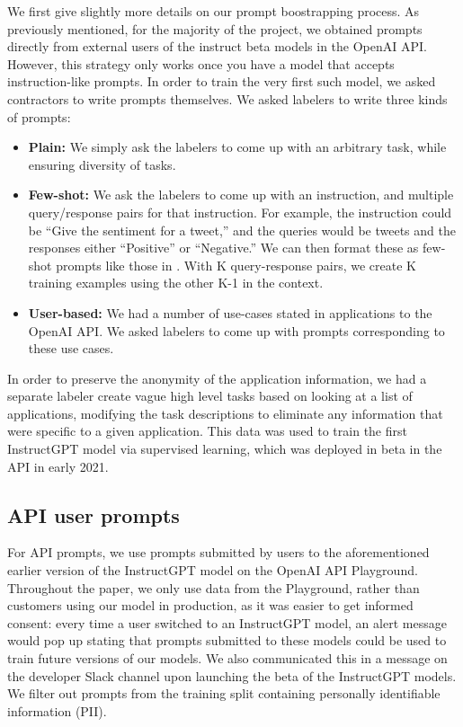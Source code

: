 We first give slightly more details on our prompt boostrapping process. 
As previously mentioned, for the majority of the project, we obtained prompts directly from external users of the instruct beta models in the OpenAI API.  However, this strategy only works once you have a model that accepts instruction-like prompts.  In order to train the very first such model, we asked contractors to write prompts themselves.  We asked labelers to write three kinds of prompts:
\begin{itemize}
    \item \textbf{Plain:}  We simply ask the labelers to come up with an arbitrary task, while ensuring diversity of tasks.
\item \textbf{Few-shot:}  We ask the labelers to come up with an instruction, and multiple query/response pairs for that instruction.  For example, the instruction could be ``Give the sentiment for a tweet,'' and the queries would be tweets and the responses either ``Positive'' or ``Negative.''  We can then format these as few-shot prompts like those in \citet{brown2020language}.  With K query-response pairs, we create K training examples using the other K-1 in the context.
\item \textbf{User-based:}  We had a number of use-cases stated in applications to the OpenAI API.  We asked labelers to come up with prompts corresponding to these use cases.
\end{itemize}
 In order to preserve the anonymity of the application information, we had a separate labeler create vague high level tasks based on looking at a list of applications, modifying the task descriptions to eliminate any information that were specific to a given application. This data was used to train the first InstructGPT model via supervised learning, which was deployed in beta in the API in early 2021. 

\subsection{API user prompts}

For API prompts, we use prompts submitted by users to the aforementioned earlier version of the InstructGPT model on the OpenAI API Playground. Throughout the paper, we only use data from the Playground, rather than customers using our model in production, as it was easier to get informed consent: every time a user switched to an InstructGPT model, an alert message would pop up stating that prompts submitted to these models could be used to train future versions of our models. We also communicated this in a message on the developer Slack channel upon launching the beta of the InstructGPT models. We filter out prompts from the training split containing personally identifiable information (PII).

